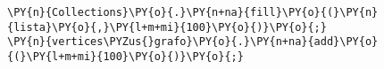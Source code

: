 \begin{Verbatim}[commandchars=\\\{\}]
\PY{n}{Collections}\PY{o}{.}\PY{n+na}{fill}\PY{o}{(}\PY{n}{lista}\PY{o}{,}\PY{l+m+mi}{100}\PY{o}{)}\PY{o}{;}
\PY{n}{vertices\PYZus{}grafo}\PY{o}{.}\PY{n+na}{add}\PY{o}{(}\PY{l+m+mi}{100}\PY{o}{)}\PY{o}{;}
\end{Verbatim}
